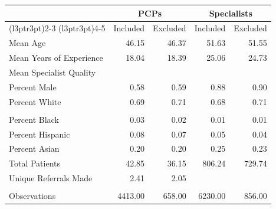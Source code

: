 
\begin{tabular}{lrrrr}
\toprule
\multicolumn{1}{c}{ } & \multicolumn{2}{c}{PCPs} & \multicolumn{2}{c}{Specialists} \\
\cmidrule(l{3pt}r{3pt}){2-3} \cmidrule(l{3pt}r{3pt}){4-5}
  & Included & Excluded & Included & Excluded\\
\midrule
Mean Age & 46.15 & 46.37 & 51.63 & 51.55\\
Mean Years of Experience & 18.04 & 18.39 & 25.06 & 24.73\\
Mean Specialist Quality &  &  &  & \\
Percent Male & 0.58 & 0.59 & 0.88 & 0.90\\
Percent White & 0.69 & 0.71 & 0.68 & 0.71\\
\addlinespace\\
Percent Black & 0.03 & 0.02 & 0.01 & 0.01\\
Percent Hispanic & 0.08 & 0.07 & 0.05 & 0.04\\
Percent Asian & 0.20 & 0.20 & 0.25 & 0.23\\
Total Patients & 42.85 & 36.15 & 806.24 & 729.74\\
Unique Referrals Made & 2.41 & 2.05 &  & \\
\addlinespace\\
Observations & 4413.00 & 658.00 & 6230.00 & 856.00\\
\bottomrule
\end{tabular}
